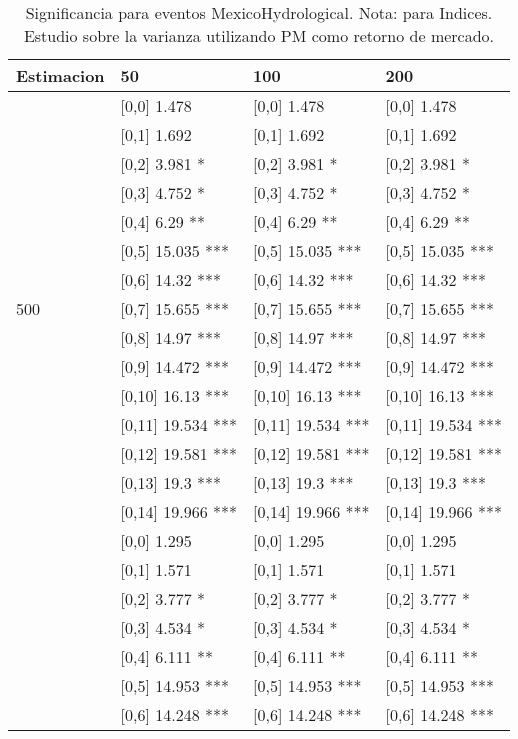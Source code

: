 \begin{table}

\caption{Significancia para eventos MexicoHydrological. Nota: para Indices. Estudio sobre la varianza utilizando PM como retorno de mercado.}
\centering
\begin{tabular}[t]{llll}
\toprule
Estimacion & 50 & 100 & 200\\
\midrule
 & {}[0,0] 1.478 & {}[0,0] 1.478 & {}[0,0] 1.478\\
 & {}[0,1] 1.692 & {}[0,1] 1.692 & {}[0,1] 1.692\\
 & {}[0,2] 3.981 * & {}[0,2] 3.981 * & {}[0,2] 3.981 *\\
 & {}[0,3] 4.752 * & {}[0,3] 4.752 * & {}[0,3] 4.752 *\\
 & {}[0,4] 6.29 ** & {}[0,4] 6.29 ** & {}[0,4] 6.29 **\\
\addlinespace
 & {}[0,5] 15.035 *** & {}[0,5] 15.035 *** & {}[0,5] 15.035 ***\\
 & {}[0,6] 14.32 *** & {}[0,6] 14.32 *** & {}[0,6] 14.32 ***\\
500 & {}[0,7] 15.655 *** & {}[0,7] 15.655 *** & {}[0,7] 15.655 ***\\
 & {}[0,8] 14.97 *** & {}[0,8] 14.97 *** & {}[0,8] 14.97 ***\\
 & {}[0,9] 14.472 *** & {}[0,9] 14.472 *** & {}[0,9] 14.472 ***\\
\addlinespace
 & {}[0,10] 16.13 *** & {}[0,10] 16.13 *** & {}[0,10] 16.13 ***\\
 & {}[0,11] 19.534 *** & {}[0,11] 19.534 *** & {}[0,11] 19.534 ***\\
 & {}[0,12] 19.581 *** & {}[0,12] 19.581 *** & {}[0,12] 19.581 ***\\
 & {}[0,13] 19.3 *** & {}[0,13] 19.3 *** & {}[0,13] 19.3 ***\\
 & {}[0,14] 19.966 *** & {}[0,14] 19.966 *** & {}[0,14] 19.966 ***\\
\addlinespace
 & {}[0,0] 1.295 & {}[0,0] 1.295 & {}[0,0] 1.295\\
 & {}[0,1] 1.571 & {}[0,1] 1.571 & {}[0,1] 1.571\\
 & {}[0,2] 3.777 * & {}[0,2] 3.777 * & {}[0,2] 3.777 *\\
 & {}[0,3] 4.534 * & {}[0,3] 4.534 * & {}[0,3] 4.534 *\\
 & {}[0,4] 6.111 ** & {}[0,4] 6.111 ** & {}[0,4] 6.111 **\\
\addlinespace
 & {}[0,5] 14.953 *** & {}[0,5] 14.953 *** & {}[0,5] 14.953 ***\\
 & {}[0,6] 14.248 *** & {}[0,6] 14.248 *** & {}[0,6] 14.248 ***\\

\end{tabular}
\end{table}
